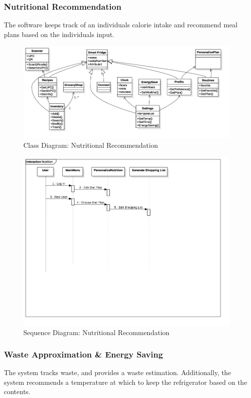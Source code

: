 	\subsubsection{Nutritional Recommendation} The software keeps track of an individuals calorie intake and recommend meal plans based on the individuals input. 
	
			\begin{figure}[p]
				\centering
				\includegraphics[width=\textwidth]{0ClassDiagram1_1.png}
				\caption{Class Diagram: Nutritional Recommendation}
			\end{figure}
			\begin{figure}[p]
				\centering
				\includegraphics[width=\textwidth]{0SequenceDiagram_Nutrition.png}
				\caption{Sequence Diagram: Nutritional Recommendation}
			\end{figure}
			 
	\subsubsection{Waste Approximation \& Energy Saving} The system tracks waste, and provides a waste estimation. Additionally, the system recommends a temperature at which to keep the refrigerator based on the contents. 
	
